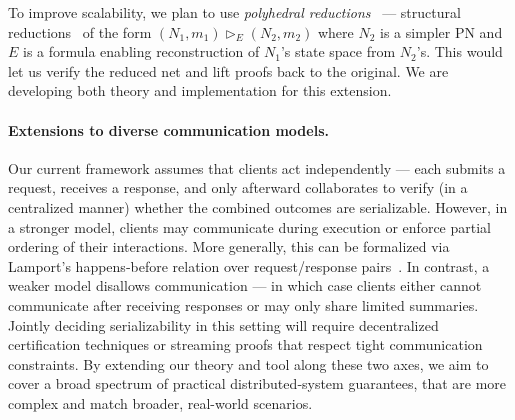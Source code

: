 To improve scalability, we plan to use \textit{polyhedral reductions}~\cite{AmBeDa21} --- structural reductions~\cite{Be87,BeLeDa20} of the form $(N_1, m_1) \vartriangleright_E (N_2, m_2)$ where $N_2$ is a simpler PN and $E$ is a formula enabling reconstruction of $N_1$'s state space from $N_2$'s. This would let us verify the reduced net and lift proofs back to the original.
%
%
%
We are developing both theory and implementation for this extension.



\paragraph{Extensions to diverse communication models.}

Our current framework assumes that clients act independently --- each submits a request, receives a response, and only afterward collaborates to verify (in a centralized manner) whether the combined outcomes are serializable. However, in a stronger model, clients may communicate during execution or enforce partial ordering of their interactions. More generally, this can be formalized via Lamport’s happens‐before relation over request/response pairs~\cite{La78}. 
%
In contrast, a weaker model disallows communication --- in which case clients either cannot communicate after receiving responses or may only share limited summaries. Jointly deciding serializability in this setting will require decentralized certification techniques or streaming proofs that respect tight communication constraints. 
%
By extending our theory and tool along these two axes, we aim to cover a broad spectrum of practical distributed‐system guarantees, that are more complex and match broader, real-world scenarios.

%
%
%
